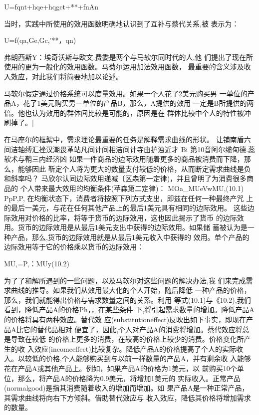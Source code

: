 U=fqnt+hqe+hqgct+**+fnAn

当时，实践中所使用的效用函数明确地认识到了互补与蔡代关系,被
表示为：

U=f(qa,Ge,Gc,'**，qn)

弗朗西斯Y：埃奇沃斯与欧文.费委是两个与马软尔同时代的人,他
们提出了现在所使用的更为一般化的效用函数。马菊尔运用加法效用函数，
最重要的含义涉及收入效应，对此我们将简要地加以论述。

马软尔假定通过价格系统可以度量效用。如果一个人花了2美元购买男
一单位的产品A，花了1美元购买男一单位的产品B，那么，A提供的效用
一定是B所提供的两倍。他也认为效用的群体间比较是可能的，原因是在
群体比较中个人的特性被冲刷掉了。|

在马座尔的框絮中，需求理论最重要的任务是解释需求曲线的形状。
让铺南盾六间洁轴缚汇挫汉潮畏革站凡间计间相洁间计寺由护浊近才
Bi
第10音阿尔缆甸德.蕊软术与鞘三内经济凶
如果一件商品的边际效用随着更多的商品被消费而下降，那么，能够因此
靳定个人将为更大的数量支付较低的价格，从而断定需求曲线是负和斜率吗？
马欣尔认同边际效用递减〔区森第一定律)，并且曾明了为消费很多商品的
个人带来最大效用的均衡条件(苹森第二定律)：
MOa_MUeVwMU,(10.1)
PpP,P,
在均衡状态下，消费者将按照下列方式支出，即兹在任何一种最终产咒
上的最后一美元，与花在任何其他产品上的最后1美元具有相同的边际效用。
这些边际效用对价格的比率，将等于货币的边际效用，这也因此揭示了货币
的边际效用。货币的边际效用是从最后1美元支出中获得的边际效用。如果储
蓄被认为是一种产品，那么,货币的边际效用就是从最后1美元收入中获得的
效用。单个产品的边际效用等于它的价格乘以货币的边际效用：

MU,=P,：MUy(10.2)

为了了和解所遇到的一些问题，以及马软尔对这些问题的解决办法,我
们来完成需求曲线的推导。如果我们从效用最大化的个人开始，随后降低
一种产品的价格，那么，我们就能得出价格与需求数量之间的关系。利用
等式(10.1)与《10.2),我们看到，降低产品A的价格Ph，，在某些条件
下,将引起需求数量的增加。降低产品A的价格将具有两种效应。替代效
应(substitutioneffect)反映出如下事实，即现在产品A比它的替代品相对
便宜了，因此,个人对产品A的消费将增加。蔡代效应将总是导致在较低
的价格上更多的消费，在较高的价格上较少的消费。价格变化所产生的收
入效应(incomeeffect)比较复杂。降低产品A的价格提高了个人的实际收
入。以较低的价格,个人能够购买到与以前一样数量的产品A，并有剩余收
入能够花在产品A或其他产品上。例如，如果产品A的价格为1美元，以
前购买10个单位，那么，将产品A的价格降为0.9美元，将增加1美元的
实际收入。正常产品(normalgood)是指其消费随着收入的增加而增加。如
果产品A是一种正常产品，其需求曲线将向右下方倾斜。借助替代效应与
收入效应，降低其价格将增加需求的数量。

